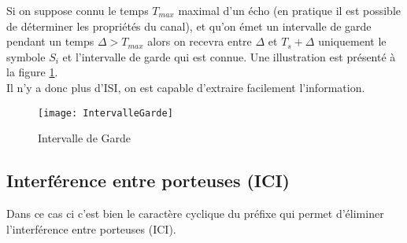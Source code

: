 Si on suppose connu le temps $T_{max}$ maximal d'un écho (en pratique il est possible de
déterminer les propriétés du canal), et qu'on émet un intervalle de garde
pendant un temps $\Delta > T_{max}$ alors on recevra entre $\Delta$ et
$T_s+\Delta$ uniquement le symbole $S_i$ et l'intervalle de garde qui est
connue. Une illustration est présenté à la figure \ref{fig:intervalleGarde}.
~\\

Il n'y a donc plus d'ISI, on est capable d'extraire facilement l'information.


\begin{figure}[!h]
  \centering
  \texttt{[image: IntervalleGarde]}
  \caption{Intervalle de Garde}
  \label{fig:intervalleGarde}
\end{figure}

\subsection{Interférence entre porteuses (ICI)}


Dans ce cas ci c'est bien le caractère cyclique du préfixe qui permet d'éliminer
l'interférence entre porteuses (ICI).



